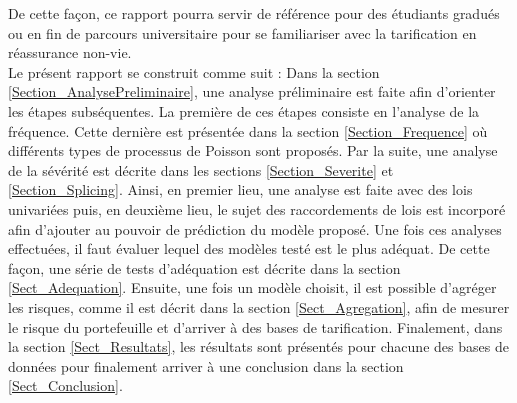 	De cette façon, ce rapport pourra servir de référence pour des étudiants gradués ou en fin de parcours universitaire pour se familiariser avec la tarification en réassurance non-vie.\\
	
	Le présent rapport se construit comme suit : Dans la section \ref{Section_AnalysePreliminaire}, une analyse préliminaire est faite afin d'orienter les étapes subséquentes. La première de ces étapes consiste en l'analyse de la fréquence. Cette dernière est présentée dans la section \ref{Section_Frequence} où différents types de processus de Poisson sont proposés. Par la suite, une analyse de la sévérité est décrite dans les sections \ref{Section_Severite} et \ref{Section_Splicing}. Ainsi, en premier lieu, une analyse est faite avec des lois univariées puis, en deuxième 
	lieu, le sujet des raccordements de lois est incorporé afin d'ajouter au pouvoir de prédiction du modèle proposé. Une fois ces analyses effectuées, il faut évaluer lequel des modèles testé est le plus adéquat. De cette façon, une série de tests d'adéquation est décrite dans la section \ref{Sect_Adequation}. Ensuite, une fois un modèle choisit, il est possible d'agréger les risques, comme il est décrit dans la section \ref{Sect_Agregation}, afin de mesurer le risque du portefeuille et d'arriver à des bases de tarification. Finalement, dans la section \ref{Sect_Resultats}, les résultats sont présentés pour chacune des bases de données pour finalement arriver à une conclusion dans la section \ref{Sect_Conclusion}.
	
